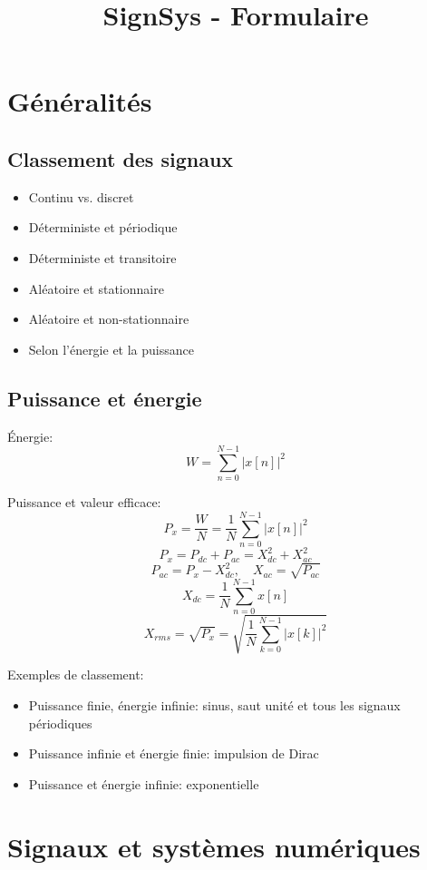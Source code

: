 \documentclass[10pt, twocolumn]{article}
\title{SignSys - Formulaire}
\begin{document}
	\maketitle
	
	\section*{Généralités}
	
		\subsection*{Classement des signaux} 
	
			\begin{itemize}
				\item Continu vs. discret
				\item Déterministe et périodique
				\item Déterministe et transitoire
				\item Aléatoire et stationnaire
				\item Aléatoire et non-stationnaire
				\item Selon l'énergie et la puissance
			\end{itemize}
		
		\subsection*{Puissance et énergie}
		
			Énergie:
			\[W=\sum_{n=0}^{N-1}|x[n]|^{2}\]
			
			Puissance et valeur efficace:
			\[P_{x}=\frac{W}{N}=\frac{1}{N} \sum_{n=0}^{N-1}|x[n]|^{2}\]
			\[P_{x}=P_{d c}+P_{a c}=X_{d c}^{2}+X_{a c}^{2}\]
			\[P_{a c}=P_{x}-X_{d c}^{2}, \quad X_{a c}=\sqrt{P_{a c}}\]
			\[X_{d c}=\frac{1}{N} \sum_{n=0}^{N-1} x[n]\]
			\[X_{r m s}=\sqrt{P_x}=\sqrt{\frac{1}{N} \sum_{k=0}^{N-1}|x[k]|^{2}}\]
			
			Exemples de classement:
			
			\begin{itemize}
				\item Puissance finie, énergie infinie: sinus, saut unité et tous les signaux périodiques
				\item Puissance infinie et énergie finie: impulsion de Dirac
				\item Puissance et énergie infinie: exponentielle
			\end{itemize}
	
	\section*{Signaux et systèmes numériques}
		
\end{document}
